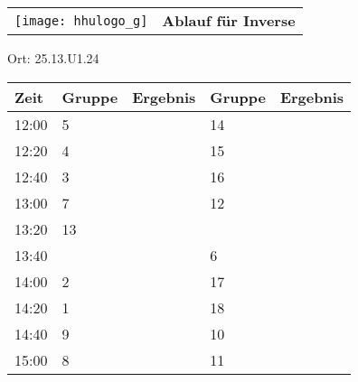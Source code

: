 \documentclass[a4paper,10pt]{article}
\def\spiele{Inverse}
\def\raumee{25.13.U1.24}
\begin{document}
   \newpage
  \begin{tabularx}{\textwidth}{lc}
    \texttt{[image: hhulogo\_g]}
  & {\Huge \textbf{Ablauf für \spiele}}
  \end{tabularx}
  \LARGE
  \begin{center}
    \vspace{1cm} 
    Ort: \raumee
  \end{center}
    \vspace{2cm} 
    \begin{tabularx}{\textwidth}{X||X|X||X|X}
	\textbf{Zeit} &\textbf{Gruppe} & \textbf{Ergebnis} &\textbf{Gruppe} & \textbf{Ergebnis}  	\\ \hline \hline
	12:00 &	5	&	&14	&	\\ \hline
	12:20 &	4	&	&15	&	\\ \hline
	12:40 &	3	&	&16	&	\\ \hline

	13:00 &	7	&	&12	&	\\ \hline
	13:20 &	13	&	&	&	\\ \hline
	13:40 &		&	&6	&	\\ \hline

	14:00 &	2	&	&17	&	\\ \hline
	14:20 &	1	&	&18	&	\\ \hline
	14:40 &	9	&	&10	&	\\ \hline

	15:00 &	8	&	&11	&	\\ \hline
      
    \end{tabularx}
   
   \newpage
\end{document}
